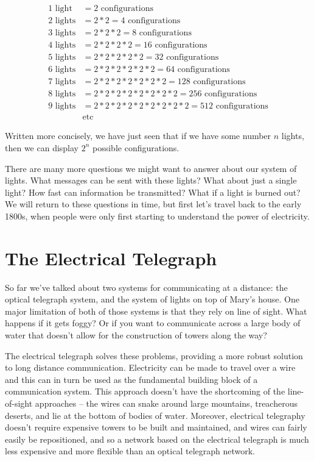 \documentclass{book}
\begin{document}
\begin{align*}
1 \text{ light} &= 2 \text{ configurations} \\
2 \text{ lights} &= 2*2 = 4 \text{ configurations} \\
3 \text{ lights} &= 2*2*2 = 8 \text{ configurations} \\
4 \text{ lights} &= 2*2*2*2 = 16 \text{ configurations} \\
5 \text{ lights} &= 2*2*2*2*2 = 32 \text{ configurations} \\
6 \text{ lights} &= 2*2*2*2*2*2 = 64 \text{ configurations} \\
7 \text{ lights} &= 2*2*2*2*2*2*2 = 128 \text{ configurations} \\
8 \text{ lights} &= 2*2*2*2*2*2*2*2 = 256 \text{ configurations} \\
9 \text{ lights} &= 2*2*2*2*2*2*2*2*2 = 512 \text{ configurations} \\
&\text{etc}
\end{align*}

Written more concisely, we have just seen that if we have some number $n$ lights, then we can display $2^n$ possible configurations.

There are many more questions we might want to answer about our system of lights. What messages can be sent with these lights? What about just a single light? How fast can information be transmitted? What if a light is burned out? We will return to these questions in time, but first let's travel back to the early 1800s, when people were only first starting to understand the power of electricity.

\chapter{The Electrical Telegraph}

So far we've talked about two systems for communicating at a distance: the optical telegraph system, and the system of lights on top of Mary's house. One major limitation of both of those systems is that they rely on line of sight. What happens if it gets foggy? Or if you want to communicate across a large body of water that doesn't allow for the construction of towers along the way?

The electrical telegraph solves these problems, providing a more robust solution to long distance communication. Electricity can be made to travel over a wire and this can in turn be used as the fundamental building block of a communication system. This approach doesn't have the shortcoming of the line-of-sight approaches – the wires can snake around large mountains, treacherous deserts, and lie at the bottom of bodies of water. Moreover, electrical telegraphy doesn't require expensive towers to be built and maintained, and wires can fairly easily be repositioned, and so a network based on the electrical telegraph is much less expensive and more flexible than an optical telegraph network.
\end{document}
